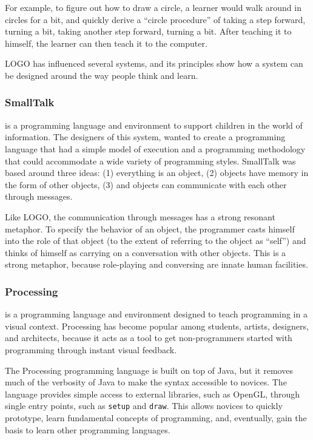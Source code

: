 For example, to figure out how to draw a circle, a learner would walk around in circles for a bit, and quickly derive a ``circle procedure'' of taking a step forward, turning a bit, taking another step forward, turning a bit. After teaching it to himself, the learner can then teach it to the computer. 

LOGO has influenced several systems, and its principles show how a system can be designed around the way people think and learn.
\subsubsection{SmallTalk~\cite{Kay1993}} is a programming language and environment to support children in the world of information. The designers of this system, wanted to create a programming language that had a simple model of execution and a programming methodology that could accommodate a wide variety of programming styles. SmallTalk was based around three ideas: (1) everything is an object, (2) objects have memory in the form of other objects, (3) and objects can communicate with each other through messages.

Like LOGO, the communication through messages has a strong resonant metaphor. To specify the behavior of an object, the programmer casts himself into the role of that object (to the extent of referring to the object as ``self'') and thinks of himself as carrying on a conversation with other objects. This is a strong metaphor, because role-playing and conversing are innate human facilities. 
\subsubsection{Processing~\cite{Reas2006}} is a programming language and environment designed to teach programming in a visual context. Processing has become popular among students, artists, designers, and architects, because it acts as a tool to get non-programmers started with programming through instant visual feedback.

The Processing programming language is built on top of Java, but it removes much of the verbosity of Java to make the syntax accessible to novices. The language provides simple access to external libraries, such as OpenGL, through single entry points, such as \texttt{setup} and \texttt{draw}. This allows novices to quickly prototype, learn fundamental concepts of programming, and, eventually, gain the basis to learn other programming languages.

